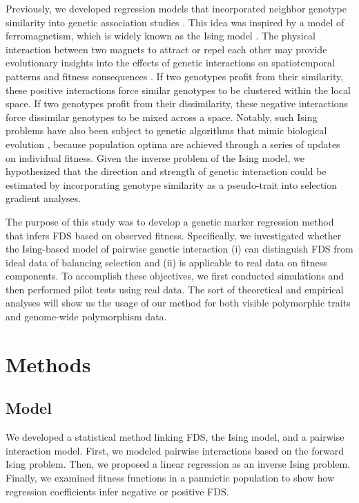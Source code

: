 \documentclass[12pt,]{article}
\begin{document}
Previously, we developed regression models that incorporated neighbor genotype similarity into genetic association studies \citep{sato2019neighbor, sato2020neighbor}. This idea was inspired by a model of ferromagnetism, which is widely known as the Ising model \citep{cipra1987introduction}. The physical interaction between two magnets to attract or repel each other may provide evolutionary insights into the effects of genetic interactions on spatiotemporal patterns and fitness consequences \citep{sato2019neighbor}. If two genotypes profit from their similarity, these positive interactions force similar genotypes to be clustered within the local space. If two genotypes profit from their dissimilarity, these negative interactions force dissimilar genotypes to be mixed across a space. Notably, such Ising problems have also been subject to genetic algorithms that mimic biological evolution \citep{anderson1991two, prugel1997dynamics}, because population optima are achieved through a series of updates on individual fitness. Given the inverse problem of the Ising model, we hypothesized that the direction and strength of genetic interaction could be estimated by incorporating genotype similarity as a pseudo-trait into selection gradient analyses.

The purpose of this study was to develop a genetic marker regression method that infers FDS based on observed fitness. Specifically, we investigated whether the Ising-based model of pairwise genetic interaction (i) can distinguish FDS from ideal data of balancing selection and (ii) is applicable to real data on fitness components. To accomplish these objectives, we first conducted simulations and then performed pilot tests using real data. The sort of theoretical and empirical analyses will show us the usage of our method for both visible polymorphic traits and genome-wide polymorphism data.


\section{Methods}

\subsection{Model}
We developed a statistical method linking FDS, the Ising model, and a pairwise interaction model. First, we modeled pairwise interactions based on the forward Ising problem. Then, we proposed a linear regression as an inverse Ising problem. Finally, we examined fitness functions in a panmictic population to show how regression coefficients infer negative or positive FDS.
\end{document}
